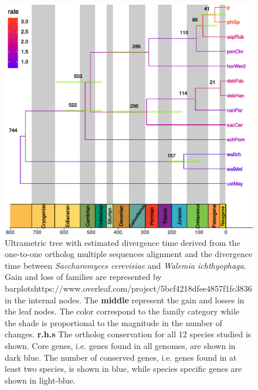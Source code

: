 \documentclass[jof,article,submit,moreauthors,pdftex,10pt,a4paper]{Definitions/mdpi}
\newcommand{\TODO}[1]{\textbf{\color{red}{#1}}}
\newcommand{\walIch}{\textit{Walemia ichthyophaga}}
\newcommand{\sacCer}{\textit{Saccharomyces cerevisiae}}
\begin{document}
\begin{figure}[!h]
  \centering
  \includegraphics[width=0.9\linewidth]{./geophyloTree.pdf}
  \caption{\label{fig:gainLossTree} Ultrametric tree with estimated
    divergence time derived from the one-to-one ortholog multiple
    sequences alignment and the divergence time between {\sacCer} and
    {\walIch}. Gain and loss of families are represented by barplotshttps://www.overleaf.com/project/5bcf4218dfee4857f1fc3836
    in the internal nodes. The \textbf{middle} represent the gain and
    losses in the leaf nodes. The color correspond to the family
    category while the shade is proportional to the magnitude in the
    number of changes. \textbf{r.h.s} The ortholog conservation for
    all 12  species studied is shown. Core genes, i.e. genes found in
    all genomes, are shown in dark blue. The number of conserved
    genes, i.e. genes found in at least two species, is shown in blue,
    while species specific genes are shown in light-blue.
    \TODO{Increase font size. Timetree analysis using the RelTime method A timetree inferred using the Reltime method [1][2] and Ordinary Least Squares estimates of branch lengths. The timetree was computed using 9 calibration constraints. The proportion of sites where at least 1 unambiguous base is present in at least 1 sequence for each descendent clade is shown next to each internal node in the tree. The analysis involved 13 amino acid sequences. All positions containing gaps and missing data were eliminated. There were a total of 37607 positions in the final dataset. Evolutionary analyses were conducted in MEGA X [3].}}
\end{figure}
\end{document}
